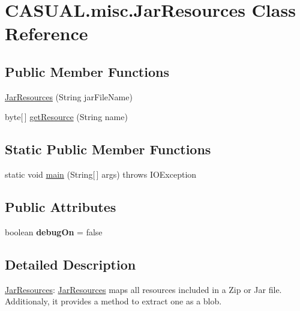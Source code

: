 \hypertarget{classCASUAL_1_1misc_1_1JarResources}{\section{C\-A\-S\-U\-A\-L.\-misc.\-Jar\-Resources Class Reference}
\label{classCASUAL_1_1misc_1_1JarResources}
}
\subsection*{Public Member Functions}
\begin{DoxyCompactItemize}
\item 
\hyperlink{classCASUAL_1_1misc_1_1JarResources_ac8ba46fea06a1252e082af6ea9a839e0}{Jar\-Resources} (String jar\-File\-Name)
\item 
byte\mbox{[}$\,$\mbox{]} \hyperlink{classCASUAL_1_1misc_1_1JarResources_a85bd36fff3d70021db81964e513872e3}{get\-Resource} (String name)
\end{DoxyCompactItemize}
\subsection*{Static Public Member Functions}
\begin{DoxyCompactItemize}
\item 
static void \hyperlink{classCASUAL_1_1misc_1_1JarResources_a63053fd99282d4d90035563a5e2a5aa1}{main} (String\mbox{[}$\,$\mbox{]} args)  throws I\-O\-Exception 
\end{DoxyCompactItemize}
\subsection*{Public Attributes}
\begin{DoxyCompactItemize}
\item 
\hypertarget{classCASUAL_1_1misc_1_1JarResources_a4b866bc0269cf9342e439ebbb5babf43}{boolean {\bfseries debug\-On} = false}\label{classCASUAL_1_1misc_1_1JarResources_a4b866bc0269cf9342e439ebbb5babf43}

\end{DoxyCompactItemize}


\subsection{Detailed Description}
\hyperlink{classCASUAL_1_1misc_1_1JarResources}{Jar\-Resources}\-: \hyperlink{classCASUAL_1_1misc_1_1JarResources}{Jar\-Resources} maps all resources included in a Zip or Jar file. Additionaly, it provides a method to extract one as a blob. 

